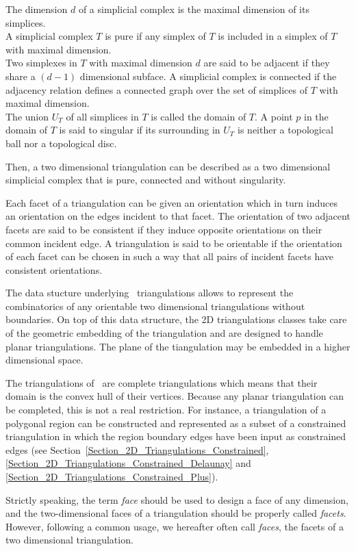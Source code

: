 The dimension $d$ of a  simplicial complex is the 
maximal dimension of its simplices. \\
A simplicial complex $T$ is pure if any simplex of $T$
is included in a simplex of $T$ with maximal dimension. \\
Two simplexes in $T$ with maximal dimension $d$ are said to be
adjacent if they share a $(d-1)$ dimensional subface.
A simplicial complex is connected if the adjacency relation
defines a connected graph 
over  the set of simplices of $T$ with maximal dimension. \\
The union $U_T$ of all simplices in $T$ is called the domain of $T$.
A point $p$ in the domain of $T$ is said to singular 
if its surrounding in $U_T$
is neither a topological ball nor a topological disc.

Then, a two dimensional triangulation can be described as a 
two dimensional simplicial complex  that is pure,
connected and without singularity.

Each facet of a triangulation can be given an orientation
which in turn induces an orientation
on the edges incident to that facet. The orientation of two adjacent
facets are said to be consistent if they induce
opposite orientations on their common incident edge.
A triangulation is said to be orientable if 
the orientation of each facet can be chosen in such a way
that all pairs of incident facets have consistent orientations. 

The data stucture underlying \cgal\ triangulations
allows to represent the combinatorics of 
any  orientable two dimensional  triangulations
without boundaries. 
On top of this data structure, the 2D triangulations classes
take care of the geometric embedding  of the triangulation
and are designed to handle planar triangulations.
The plane of the tiangulation may be embedded in a higher
dimensional space.

The  triangulations of  \cgal\ are complete triangulations
which means  that their domain is  the
convex hull of  their vertices.
Because any planar triangulation
can be completed, this is not a real restriction.
For instance, a triangulation of a  polygonal region can be
constructed  and represented as a subset  of a constrained triangulation 
in which  the region boundary edges have been input as 
constrained edges (see
Section~\ref{Section_2D_Triangulations_Constrained},
\ref{Section_2D_Triangulations_Constrained_Delaunay} and 
\ref{Section_2D_Triangulations_Constrained_Plus}).

Strictly speaking, the term {\em face} should be used
to design  a face of any dimension,
and the two-dimensional faces of a triangulation 
should be properly called {\em facets}.
However, following a common usage, we hereafter often call {\em
faces}, the facets
of a two dimensional triangulation.


